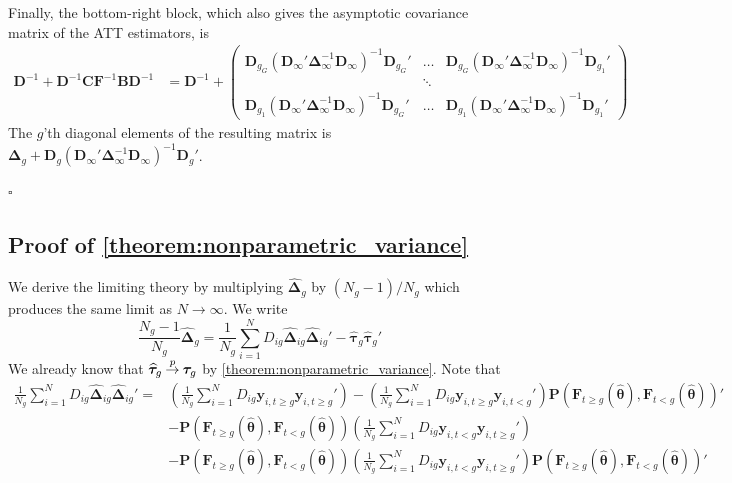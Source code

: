\documentclass[12pt]{article}
\begin{document}
Finally, the bottom-right block, which also gives the asymptotic covariance matrix of the ATT estimators, is 
\begin{align*}
    \bm D^{-1} + \bm D^{-1} \bm C \bm F^{-1} \bm B \bm D^{-1} 
    &= \bm D^{-1} + 
    \begin{pmatrix}
        \bm D_{g_G} (\bm D_{\infty}' \bm \Delta_{\infty}^{-1} \bm D_{\infty})^{-1} \bm D_{g_G}' & \hdots & \bm D_{g_G} (\bm D_{\infty}' \bm \Delta_{\infty}^{-1} \bm D_{\infty})^{-1} \bm D_{g_1}'\\
        & \ddots &\\
        \bm D_{g_1} (\bm D_{\infty}' \bm \Delta_{\infty}^{-1} \bm D_{\infty})^{-1} \bm D_{g_G}' & \hdots & \bm D_{g_1} (\bm D_{\infty}' \bm \Delta_{\infty}^{-1} \bm D_{\infty})^{-1} \bm D_{g_1}'
    \end{pmatrix}
\end{align*}
The $g$'th diagonal elements of the resulting matrix is $\bm \Delta_g + \bm D_g (\bm D_{\infty}' \bm \Delta_{\infty}^{-1} \bm D_{\infty})^{-1} \bm D_g'$.

$\square$


\subsection*{Proof of \autoref{theorem:nonparametric_variance}}

We derive the limiting theory by multiplying $\widehat{\bm \Delta}_g$ by $(N_g-1)/N_g$ which produces the same limit as $N \rightarrow \infty$. We write
\begin{equation*}
    \frac{N_g - 1}{ N_g} \widehat{\bm \Delta}_g = \frac{1}{N_g} \sum_{i = 1}^N D_{ig} \widehat{\bm \Delta}_{ig} \widehat{\bm \Delta}_{ig}' - \widehat{\bm \tau}_g \widehat{\bm \tau}_g'
\end{equation*}
We already know that $\widehat{\bm \tau}_g \mathbin{\overset{p}{\to}} \bm \tau_g$ by \autoref{theorem:nonparametric_variance}. Note that 
\begin{align*}
    \frac{1}{N_g} \sum_{i = 1}^N D_{ig} \widehat{\bm \Delta}_{ig} \widehat{\bm \Delta}_{ig}' = &\left( \frac{1}{N_g} \sum_{i = 1}^N D_{ig}  \bm y_{i, t \geq g} \bm y_{i, t \geq g}' \right) - \left( \frac{1}{N_g} \sum_{i = 1}^N D_{ig} \bm y_{i, t \geq g} \bm y_{i, t < g}' \right) \bm P(\bm F_{t \geq g}(\widehat{\bm \theta}), \bm F_{t < g}(\widehat{\bm \theta}))'\\
    &- \bm P(\bm F_{t \geq g}(\widehat{\bm \theta}), \bm F_{t < g}(\widehat{\bm \theta})) \left( \frac{1}{N_g} \sum_{i = 1}^N D_{ig} \bm y_{i, t < g} \bm y_{i, t \geq g}' \right)\\
    &- \bm P(\bm F_{t \geq g}(\widehat{\bm \theta}), \bm F_{t < g}(\widehat{\bm \theta})) \left( \frac{1}{N_g} \sum_{i = 1}^N D_{ig}  \bm y_{i, t < g} \bm y_{i, t \geq g}' \right) \bm P(\bm F_{t \geq g}(\widehat{\bm \theta}), \bm F_{t < g}(\widehat{\bm \theta}))'
\end{align*} 
\end{document}
